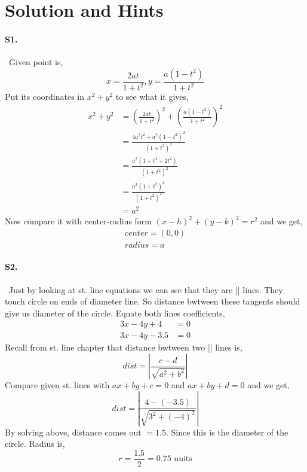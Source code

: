 \documentclass{article}
\begin{document}
\section*{Solution and Hints}
\paragraph{S1.}\
Given point is,
\begin{equation*}
    x=\frac{2at}{1+t^2},y=\frac{a(1-t^2)}{1+t^2}
\end{equation*}
Put its coordinates in $x^2+y^2$ to see what it gives,
\begin{align*}
    x^2+y^2&=\left(\frac{2at}{1+t^2}\right)^2+\left(\frac{a(1-t^2)}{1+t^2}\right)^2\\
    &=\frac{4a^2t^2+a^2(1-t^2)^2}{(1+t^2)^2}\\
    &=\frac{a^2(1+t^4+2t^2)}{(1+t^2)^2}\\
    &=\frac{a^2(1+t^2)^2}{(1+t^2)^2}\\
    &=a^2
\end{align*}
Now compare it with center-radius form $(x-h)^2+(y-k)^2=r^2$ and we get,
\begin{align*}
    center=(0,0)\\
    radius=a
\end{align*}
\paragraph{S2.}\
Just by looking at st. line equations we can see that they are || lines. They touch circle on ends of diameter line. So distance bwtween these tangents should give us diameter of the circle. Equate both lines coefficients,
\begin{align*}
    3x-4y+4&=0\\
    3x-4y-3.5&=0
\end{align*}
Recall from st. line chapter that distance bwtween two || lines is,
\begin{equation*}
    dist=\left|\frac{c-d}{\sqrt{a^2+b^2}}\right|
\end{equation*}
Compare given st. lines with $ax+by+c=0$ and $ax+by+d=0$ and we get,
\begin{equation*}
    dist=\left|\frac{4-(-3.5)}{\sqrt{3^2+(-4)^2}}\right|
\end{equation*}
By solving above, distance comes out $=1.5$. Since this is the diameter of the circle. Radius is,
\begin{equation*}
    r=\frac{1.5}{2}=0.75 \text{  units}
\end{equation*}
\end{document}
